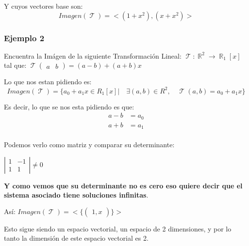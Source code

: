 \documentclass[12pt]{report}                                    %
\DeclareMathOperator \Real {\mathbb{R}}                         %
\DeclareMathOperator \LinealTransformation {\mathcal{T}}        %
\DeclareMathOperator \LT {\mathcal{T}}                          %
\newcommand{\pVector}[1]{                                       %
        \ensuremath{\begin{pmatrix}#1\end{pmatrix}}                 %
    }
\newcommand{\Vector}[1]{                                        %
        \ensuremath{\begin{matrix}#1\end{matrix}}                   %
    }
\begin{document}
            Y cuyos vectores base son:
            \begin{equation*}
                Imagen(\LinealTransformation) = <(1+x^2) , (x+x^2)>
            \end{equation*}

            \clearpage
            \subsubsection{Ejemplo 2}
            Encuentra la Imágen de la siguiente Transformación Lineal:
            $\LinealTransformation : \Real^2 \to \Real_1[x]$ tal que: 
            $\LinealTransformation \pVector{a&b} = (a-b) + (a+b)x$

            Lo que nos estan pidiendo es:
            \begin{equation*}
                Imagen(\LT) = \{a_0+a_1x \in R_1[x] |\quad \exists (a,b) \in R^2 ,\quad 
                \LinealTransformation(a,b) = a_0+a_1x\}
            \end{equation*}

            Es decir, lo que se nos esta pidiendo es que:
            \begin{equation*}
            \begin{split}
                a - b           & = a_0 \\
                a + b           & = a_1 \\
             \end{split}
            \end{equation*}

            Podemos verlo como matriz y comparar su determinante:

            $\left| \Vector{1&-1\\1&1} \right| \neq 0$

            \textbf{Y como vemos que su determinante no es cero eso quiere
            decir que el sistema asociado tiene soluciones infinitas}.

            Así: $Imagen(\LT) =  < \{ \pVector{1, x} \} > $

            Esto sigue siendo un espacio vectorial, un espacio de 2 dimensiones,
            y por lo tanto la dimensión de este espacio vectorial es 2.




\clearpage
\end{document}
